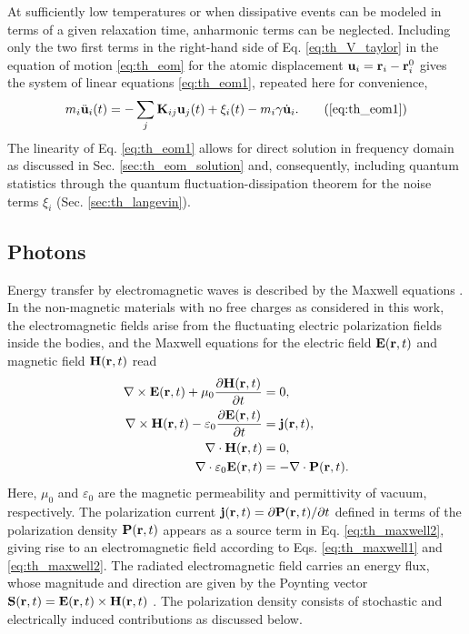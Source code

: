 At sufficiently low temperatures or when dissipative events can be modeled in terms of a given relaxation time, anharmonic terms can be neglected. Including only the two first terms in the right-hand side of Eq. \eqref{eq:th_V_taylor} in the equation of motion \eqref{eq:th_eom} for the atomic displacement $\mathbf{u}_i=\mathbf{r}_i-\mathbf{r}_i^0$ gives the system of linear equations \eqref{eq:th_eom1}, repeated here for convenience,
\begin{equation}
 m_i \ddot{\bu}_i(t) =  - \sum_j \bb{K}_{ij}\bb{u}_j(t) + \xi_i(t) - m_i \gamma \dot{\bu}_i.  \tag{\ref{eq:th_eom1}}
\end{equation}
The linearity of Eq. \eqref{eq:th_eom1} allows for direct solution in frequency domain as discussed in Sec. \ref{sec:th_eom_solution} and, consequently, including quantum statistics through the quantum fluctuation-dissipation theorem for the noise terms $\xi_i$ (Sec. \ref{sec:th_langevin}). 

\subsection{Photons}
\label{sec:th_eom2_photon}
Energy transfer by electromagnetic waves is described by the Maxwell equations \cite{jackson}. In the non-magnetic materials with no free charges as considered in this work, the electromagnetic fields arise from the fluctuating electric polarization fields inside the bodies, and the Maxwell equations for the electric field $\mathbf{E}(\mathbf{r},t)$ and magnetic field $\mathbf{H}(\mathbf{r},t)$ read \cite{novotny}
\begin{subequations}
\begin{align}
  \nabla \times \mathbf{E}(\mathbf{r},t) + \mu_0 \frac{\partial \mathbf{H}(\mathbf{r},t)}{\partial t} &= 0 , \label{eq:th_maxwell1} \\
  \nabla \times \mathbf{H}(\mathbf{r},t) - \varepsilon_0 \frac{\partial \mathbf{E}(\mathbf{r},t)}{\partial t} &=  \mathbf{j}(\mathbf{r},t) , \label{eq:th_maxwell2} \\
   \nabla \cdot \mathbf{H}(\mathbf{r},t) &= 0, \\
   \nabla \cdot \varepsilon_0 \mathbf{E}(\mathbf{r},t) &= -\nabla \cdot \mathbf{P}(\mathbf{r},t).
\end{align}
\end{subequations}
Here, $\mu_0$ and $\varepsilon_0$ are the magnetic permeability and permittivity of vacuum, respectively. The polarization current $\mathbf{j}(\mathbf{r},t)=\partial \mathbf{P}(\mathbf{r},t)/\partial t$ defined in terms of the polarization density $\mathbf{P}(\mathbf{r},t)$ appears as a source term in Eq. \eqref{eq:th_maxwell2}, giving rise to an electromagnetic field according to Eqs. \eqref{eq:th_maxwell1} and \eqref{eq:th_maxwell2}. The radiated electromagnetic field carries an energy flux, whose magnitude and direction are given by the Poynting vector $\mathbf{S}(\mathbf{r},t)=\mathbf{E}(\mathbf{r},t)\times \mathbf{H}(\mathbf{r},t)$ \cite{novotny}. The polarization density consists of stochastic and electrically induced contributions \cite{benabdallah11} as discussed below. 

